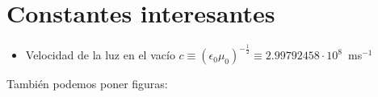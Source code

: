 \chapter{Constantes interesantes}
\graphicspath{{Figures/apend1/}}
\label{cap:apend1}

\begin{itemize}

\item Velocidad de la luz en el vacío  $c \equiv (\epsilon_{0}\mu_{0})^{-\frac{1}{2}} \equiv 2.99792458\cdot 10^{8}$~ms$^{-1}$

\end{itemize}

También podemos poner figuras:


